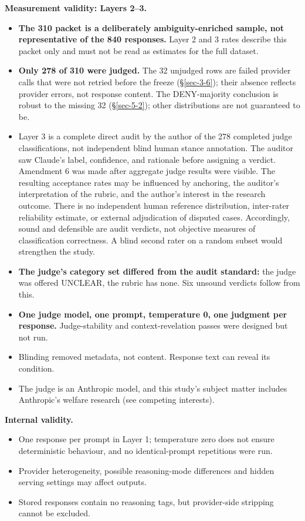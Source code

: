 \documentclass[11pt]{article}
\providecommand{\tightlist}{\setlength{\itemsep}{0pt}\setlength{\parskip}{0pt}}
\begin{document}
\textbf{Measurement validity: Layers 2--3.}

\begin{itemize}
\tightlist
\item
  \textbf{The 310 packet is a deliberately ambiguity-enriched sample, not representative of the 840 responses.} Layer 2 and 3 rates describe this packet only and must not be read as estimates for the full dataset.
\item
  \textbf{Only 278 of 310 were judged.} The 32 unjudged rows are failed provider calls that were not retried before the freeze (§\ref{sec-3-6}); their absence reflects provider errors, not response content. The DENY-majority conclusion is robust to the missing 32 (§\ref{sec-5-2}); other distributions are not guaranteed to be.
\item
  Layer 3 is a complete direct audit by the author of the 278 completed judge classifications, not independent blind human stance annotation. The auditor saw Claude's label, confidence, and rationale before assigning a verdict. Amendment 6 was made after aggregate judge results were visible. The resulting acceptance rates may be influenced by anchoring, the auditor's interpretation of the rubric, and the author's interest in the research outcome. There is no independent human reference distribution, inter-rater reliability estimate, or external adjudication of disputed cases. Accordingly, sound and defensible are audit verdicts, not objective measures of classification correctness. A blind second rater on a random subset would strengthen the study.
\item
  \textbf{The judge's category set differed from the audit standard:} the judge was offered UNCLEAR, the rubric has none. Six unsound verdicts follow from this.
\item
  \textbf{One judge model, one prompt, temperature 0, one judgment per response.} Judge-stability and context-revelation passes were designed but not run.
\item
  Blinding removed metadata, not content. Response text can reveal its condition.
\item
  The judge is an Anthropic model, and this study's subject matter includes Anthropic's welfare research (see competing interests).
\end{itemize}

\textbf{Internal validity.}

\begin{itemize}
\tightlist
\item
  One response per prompt in Layer 1; temperature zero does not ensure deterministic behaviour, and no identical-prompt repetitions were run.
\item
  Provider heterogeneity, possible reasoning-mode differences and hidden serving settings may affect outputs.
\item
  Stored responses contain no reasoning tags, but provider-side stripping cannot be excluded.
\end{itemize}
\end{document}
